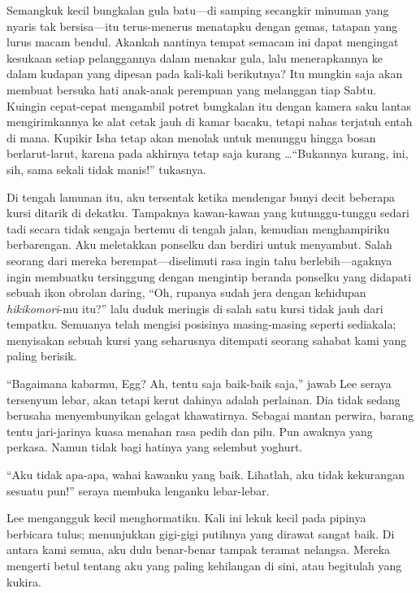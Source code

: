 \documentclass[smalldemyvopaper,11pt,twoside,onecolumn,openright,extrafontsizes]{memoir}
\begin{document}

Semangkuk kecil bungkalan gula batu---di samping secangkir minuman yang nyaris tak bersisa---itu terus-menerus menatapku dengan gemas, tatapan yang lurus macam bendul. Akankah nantinya tempat semacam ini dapat mengingat kesukaan setiap pelanggannya dalam menakar gula, lalu menerapkannya ke dalam kudapan yang dipesan pada kali-kali berikutnya? Itu mungkin saja akan membuat bersuka hati anak-anak perempuan yang melanggan tiap Sabtu. Kuingin cepat-cepat mengambil potret bungkalan itu dengan kamera saku lantas mengirimkannya ke alat cetak jauh di kamar bacaku, tetapi nahas terjatuh entah di mana. Kupikir Isha tetap akan menolak untuk menunggu hingga bosan berlarut-larut, karena pada akhirnya tetap saja kurang \dots ``Bukannya kurang, ini, sih, sama sekali tidak manis!'' tukasnya.


Di tengah lamunan itu, aku tersentak ketika mendengar bunyi decit beberapa kursi ditarik di dekatku. Tampaknya kawan-kawan yang kutunggu-tunggu sedari tadi secara tidak sengaja bertemu di tengah jalan, kemudian menghampiriku berbarengan. Aku meletakkan ponselku dan berdiri untuk menyambut. Salah seorang dari mereka berempat---diselimuti rasa ingin tahu berlebih---agaknya ingin membuatku tersinggung dengan mengintip beranda ponselku yang didapati sebuah ikon obrolan daring, ``Oh, rupanya sudah jera dengan kehidupan \textit{hikikomori}-mu itu?'' lalu duduk meringis di salah satu kursi tidak jauh dari tempatku. Semuanya telah mengisi posisinya masing-masing seperti sediakala; menyisakan sebuah kursi yang seharusnya ditempati seorang sahabat kami yang paling berisik.

``Bagaimana kabarmu, Egg? Ah, tentu saja baik-baik saja,'' jawab Lee seraya tersenyum lebar, akan tetapi kerut dahinya adalah perlainan. Dia tidak sedang berusaha menyembunyikan gelagat khawatirnya. Sebagai mantan perwira, barang tentu jari-jarinya kuasa menahan rasa pedih dan pilu. Pun awaknya yang perkasa. Namun tidak bagi hatinya yang selembut yoghurt.

``Aku tidak apa-apa, wahai kawanku yang baik. Lihatlah, aku tidak kekurangan sesuatu pun!'' seraya membuka lenganku lebar-lebar.

Lee mengangguk kecil menghormatiku. Kali ini lekuk kecil pada pipinya berbicara tulus; menunjukkan gigi-gigi putihnya yang dirawat sangat baik. Di antara kami semua, aku dulu benar-benar tampak teramat nelangsa. Mereka mengerti betul tentang aku yang paling kehilangan di sini, atau begitulah yang kukira.
\end{document}
